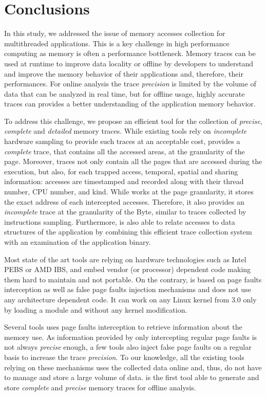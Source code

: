 \section{Conclusions}
\label{sec:cncl}

In this study, we addressed the issue of memory accesses collection for
multithreaded applications. This is a key challenge in high performance
computing as memory is often a performance
bottleneck. Memory traces can be used at runtime to improve data locality or
offline by developers to understand and improve the memory
behavior of their applications and, therefore, their performances. For online analysis the trace \emph{precision}
is limited by the volume of data that can be analyzed in real time, but for
offline usage, highly accurate traces can provides a better understanding of
the application memory behavior.

To address this challenge, we propose \Moca an efficient tool for the collection of \emph{precise},
\emph{complete} and \emph{detailed} memory traces. While existing tools
rely on \emph{incomplete} hardware sampling to
provide such traces at an acceptable cost, \Moca provides a \emph{complete}
trace, that contains all the accessed areas, at the granularity of the page.
Moreover, \Moca traces not only
contain all the pages that are accessed during the execution, but also, 
for each trapped access, temporal, spatial and sharing
information: accesses are timestamped and recorded along with their thread number, CPU number, and kind.
While \Moca works at the page granularity, it stores the exact
address of each intercepted accesses. Therefore, it also provides an
\emph{incomplete} trace at the granularity of the Byte, similar to
traces collected by instructions sampling. Furthermore, \Moca is also able to relate accesses to
data structures of the application by combining this efficient trace collection system with an examination
of the application binary.

Most state of the art tools are relying on hardware technologies such as Intel PEBS
or AMD IBS, and embed vendor (or processor) dependent code making them hard
to maintain and not portable. On the contrary, \Moca is based on page
faults interception as well as false page faults injection mechanisms and does not use any architecture dependent code.
It can work on any Linux kernel from $3.0$ only by loading a module and
without any kernel modification.

Several tools uses page faults interception to retrieve information about the memory
use. As information provided by only intercepting regular page faults
is not always \emph{precise} enough, a few tools also inject false page faults
on a regular basis to increase the trace \emph{precision}. To our knowledge, all the
existing tools relying on these mechanisms uses the collected data online and,
thus, do not have to manage and store a large volume of data. \Moca is the
first tool able to generate and store \emph{complete} and \emph{precise} memory traces for offline
analysis.

